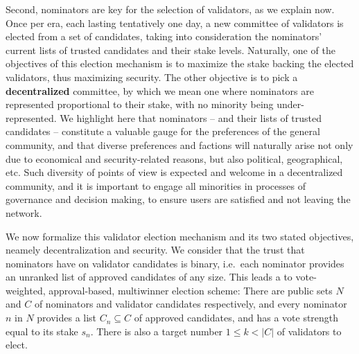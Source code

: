 Second, nominators are key for the selection of validators, as we explain now. Once per era, each lasting tentatively one day, a new committee of validators is elected from a set of candidates, taking into consideration the nominators' current lists of trusted candidates and their stake levels. Naturally, one of the objectives of this election mechanism is to maximize the stake backing the elected validators, thus maximizing security. The other objective is to pick a \textbf{decentralized} committee, by which we mean one where nominators are represented proportional to their stake, with no minority being under-represented. 
We highlight here that nominators -- and their lists of trusted candidates -- constitute a valuable gauge for the preferences of the general community, and that diverse preferences and factions will naturally arise not only due to economical and security-related reasons, but also political, geographical, etc. Such diversity of points of view is expected and welcome in a decentralized community, and it is important to engage all minorities in processes of governance and decision making, to ensure users are satisfied and not leaving the network. 

We now formalize this validator election mechanism and its two stated objectives, neamely decentralization and security.
We consider that the trust that nominators have on validator candidates is binary, i.e.~each nominator provides an unranked list of approved candidates of any size. 
This leads a to vote-weighted, approval-based, multiwinner election scheme: 
There are public sets $N$ and $C$ of nominators and validator candidates respectively, and every nominator $n$ in $N$ provides a list $C_n\subseteq C$ of approved candidates, and has a vote strength equal to its stake $s_n$. There is also a target number $1\leq k<|C|$ of validators to elect.



